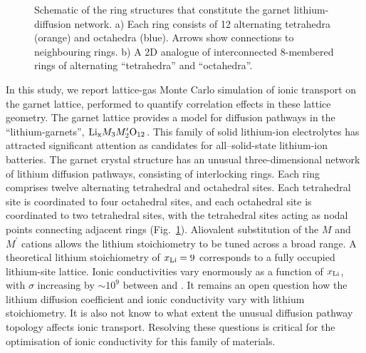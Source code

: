 \documentclass[aps,prb,twocolumn,superscriptaddress,reprint]{revtex4-1}
\newcommand{\xLi}{x_\m{Li}}
\begin{document}
\begin{figure}[tb]
  \centering
    \caption{\label{fig:garnet_network_schematic}Schematic of the ring structures that constitute the garnet lithium-diffusion network. a) Each ring consists of 12 alternating tetrahedra (orange) and octahedra (blue). 
Arrows show connections to neighbouring rings.\cite{AwakaEtAl_ChemLett2011} b) A 2D analogue of interconnected 8-membered rings of alternating ``tetrahedra'' and ``octahedra''.}
\end{figure}

In this study, we report lattice-gas Monte Carlo simulation of ionic transport on the garnet lattice, performed to quantify correlation effects in these lattice geometry. The garnet lattice provides a model for diffusion pathways in the ``lithium-garnets'', $\mathrm{Li}_{\mathrm{x}}M_3M^\prime_2\mathrm{O}_{12}$.\cite{ThangaduraiEtAl_JAmCeramSoc2003, ThangaduraiEtAl_JPhysChemLett2015} This family of solid lithium-ion electrolytes has attracted significant attention as candidates for all--solid-state lithium-ion batteries.\cite{BachmanEtAl_ChemRev2016, InadaEtAl_FrontEnergyRes2016,HanEtAl_NatMater2016, RamakumarEtAl_ProgMaterSci2017} The garnet crystal structure has an unusual three-dimensional network of lithium diffusion pathways, consisting of interlocking rings.\cite{AwakaEtAl_ChemLett2011} Each ring comprises twelve alternating tetrahedral and octahedral sites. Each tetrahedral site is coordinated to four octahedral sites, and each octahedral site is coordinated to two tetrahedral sites, with the tetrahedral sites acting as nodal points connecting adjacent rings (Fig.~\ref{fig:garnet_network_schematic}).
Aliovalent substitution of the $M$ and $M^\prime$ cations allows the lithium stoichiometry to be tuned across a broad range. 
A theoretical lithium stoichiometry of $\xLi=9$ corresponds to a fully occupied lithium-site lattice. 
Ionic conductivities vary enormously as a function of $\xLi$, with $\sigma$ increasing by $\sim\!10^9$ between  and .\cite{ThangaduraiEtAl_JPhysChemLett2015, BachmanEtAl_ChemRev2016} It remains an open question how the lithium diffusion coefficient and ionic conductivity vary with lithium stoichiometry. It is also not know to what extent the unusual diffusion pathway topology affects ionic transport. Resolving these questions is critical for the optimisation of ionic conductivity for this family of materials.
\end{document}
